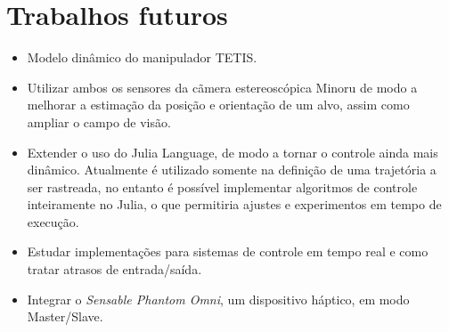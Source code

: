 \section{Trabalhos futuros}
\begin{itemize}
\item Modelo dinâmico do manipulador TETIS.

\item Utilizar ambos os sensores da cãmera estereoscópica Minoru de modo a melhorar a estimação da posição e orientação de um alvo, assim como ampliar o campo de visão.

\item Extender o uso do Julia Language, de modo a tornar o controle ainda mais dinâmico. Atualmente é utilizado somente na definição de uma trajetória a ser rastreada, no entanto é possível implementar algoritmos de controle inteiramente no Julia, o que permitiria ajustes e experimentos em tempo de execução.

\item Estudar implementações para sistemas de controle em tempo real e como tratar atrasos de entrada/saída.
\item Integrar o \textit{Sensable Phantom Omni}, um dispositivo háptico, em modo Master/Slave.
\end{itemize}


